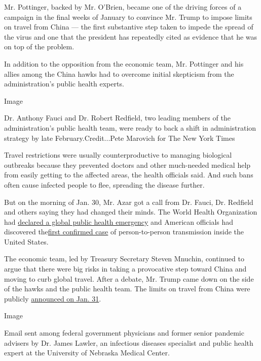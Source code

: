 Mr. Pottinger, backed by Mr. O'Brien, became one of the driving forces
of a campaign in the final weeks of January to convince Mr. Trump to
impose limits on travel from China --- the first substantive step taken
to impede the spread of the virus and one that the president has
repeatedly cited as evidence that he was on top of the problem.

In addition to the opposition from the economic team, Mr. Pottinger and
his allies among the China hawks had to overcome initial skepticism from
the administration's public health experts.

Image

Dr. Anthony Fauci and Dr. Robert Redfield, two leading members of the
administration's public health team, were ready to back a shift in
administration strategy by late February.Credit...Pete Marovich for The
New York Times

Travel restrictions were usually counterproductive to managing
biological outbreaks because they prevented doctors and other
much-needed medical help from easily getting to the affected areas, the
health officials said. And such bans often cause infected people to
flee, spreading the disease further.

But on the morning of Jan. 30, Mr. Azar got a call from Dr. Fauci, Dr.
Redfield and others saying they had changed their minds. The World
Health Organization had
\href{https://www.who.int/news-room/detail/30-01-2020-statement-on-the-second-meeting-of-the-international-health-regulations-(2005)-emergency-committee-regarding-the-outbreak-of-novel-coronavirus-(2019-ncov)}{declared
a global public health emergency} and American officials had discovered
the\href{https://www.cdc.gov/media/releases/2020/p0130-coronavirus-spread.html}{first
confirmed case} of person-to-person transmission inside the United
States.

The economic team, led by Treasury Secretary Steven Mnuchin, continued
to argue that there were big risks in taking a provocative step toward
China and moving to curb global travel. After a debate, Mr. Trump came
down on the side of the hawks and the public health team. The limits on
travel from China were publicly
\href{https://www.whitehouse.gov/presidential-actions/proclamation-suspension-entry-immigrants-nonimmigrants-persons-pose-risk-transmitting-2019-novel-coronavirus/}{announced
on Jan. 31}.

Image

Email sent among federal government physicians and former senior
pandemic advisers by Dr. James Lawler, an infectious diseases specialist
and public health expert at the University of Nebraska Medical Center.

